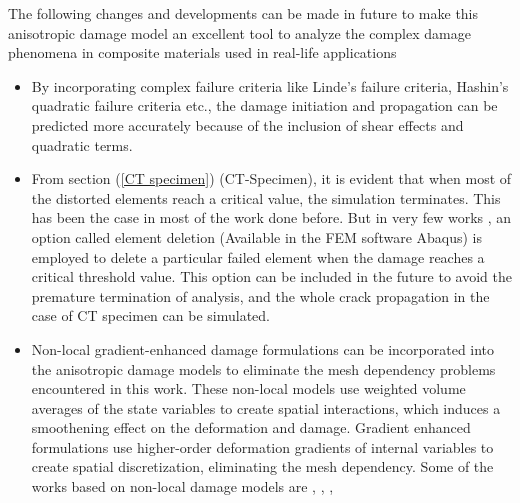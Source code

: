 \documentclass[12pt,a4paper,twoside,openright]{report}
\let\tmp\oddsidemargin
\let\oddsidemargin\evensidemargin
\let\evensidemargin\tmp
\begin{document}
The following changes and developments can be made in future to make this anisotropic damage model an excellent tool to analyze the complex damage phenomena in composite materials used in real-life applications
\begin{itemize}
\item By incorporating complex failure criteria like Linde's failure criteria, Hashin's quadratic failure criteria \citep{jiang2018evaluations} etc., the damage initiation and propagation can be predicted more accurately because of the inclusion of shear effects and quadratic terms.

\item From section (\ref{CT specimen}) (CT-Specimen), it is evident that when most of the distorted elements reach a critical value, the simulation terminates. This has been the case in most of the work done before. But in very few works \citep{jiang2018evaluations}, \citep{sokolinsky2011numerical} an option called element deletion (Available in the FEM software Abaqus) is employed to delete a particular failed element when the damage reaches a critical threshold value. This option can be included in the future to avoid the premature termination of analysis, and the whole crack propagation in the case of CT specimen can be simulated. 

\item Non-local gradient-enhanced damage formulations can be incorporated into the anisotropic damage models to eliminate the mesh dependency problems encountered in this work.  These non-local models use weighted volume averages of the state variables to create spatial interactions, which induces a smoothening effect on the deformation and damage.  Gradient enhanced formulations use higher-order deformation gradients of internal variables to create spatial discretization, eliminating the mesh dependency. Some of the works based on non-local damage models are \citep{peerlings1999enhanced}, \citep{fassin2019gradient}, \citep{geers1998experimental}, \citep{seupel2018efficient}


\end{itemize}





\newpage




\clearpage
\thispagestyle{empty}
\hfill
\clearpage
	\let\tmp\oddsidemargin
	\let\oddsidemargin\evensidemargin
	\let\evensidemargin\tmp
	\reversemarginpar
{}
\end{document}

